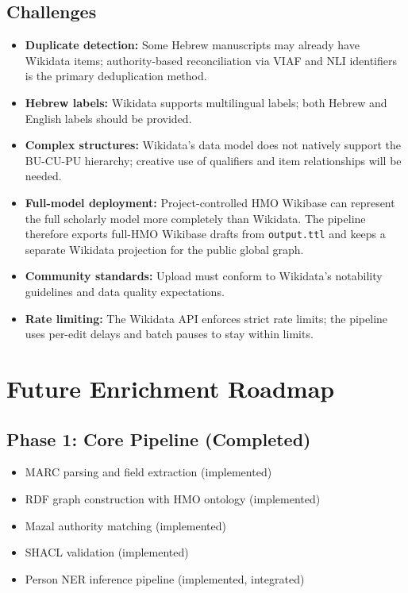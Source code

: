 \documentclass[12pt]{article}
\newcommand{\code}[1]{\texttt{#1}}
\begin{document}
\subsection{Challenges}

\begin{itemize}
\item \textbf{Duplicate detection:} Some Hebrew manuscripts may already have Wikidata items; authority-based reconciliation via VIAF and NLI identifiers is the primary deduplication method.
\item \textbf{Hebrew labels:} Wikidata supports multilingual labels; both Hebrew and English labels should be provided.
\item \textbf{Complex structures:} Wikidata's data model does not natively support the BU-CU-PU hierarchy; creative use of qualifiers and item relationships will be needed.
\item \textbf{Full-model deployment:} Project-controlled HMO Wikibase can represent the full scholarly model more completely than Wikidata. The pipeline therefore exports full-HMO Wikibase drafts from \code{output.ttl} and keeps a separate Wikidata projection for the public global graph.
\item \textbf{Community standards:} Upload must conform to Wikidata's notability guidelines and data quality expectations.
\item \textbf{Rate limiting:} The Wikidata API enforces strict rate limits; the pipeline uses per-edit delays and batch pauses to stay within limits.
\end{itemize}


\section{Future Enrichment Roadmap}
\label{sec:roadmap}

\subsection{Phase 1: Core Pipeline (Completed)}

\begin{itemize}
\item MARC parsing and field extraction (implemented)
\item RDF graph construction with HMO ontology (implemented)
\item Mazal authority matching (implemented)
\item SHACL validation (implemented)
\item Person NER inference pipeline (implemented, integrated)
\end{itemize}
\end{document}
